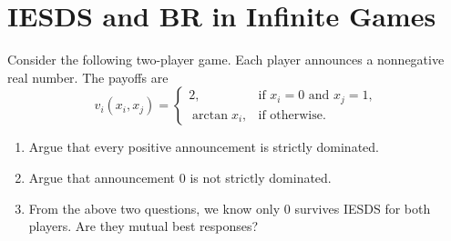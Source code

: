 \documentclass[12pt,a4paper]{article}
\begin{document}
\section{IESDS and BR in Infinite Games}
Consider the following two-player game. Each player announces a nonnegative real number. The payoffs are
\[
  v_i(x_i, x_j)=
  \begin{cases}
    2, & \text{if } x_i=0 \text{ and } x_j=1,\\[6pt]
    \arctan x_i, & \text{if otherwise.}
  \end{cases}
\]
\begin{enumerate}[label=(\alph*)]
  \item Argue that every positive announcement is strictly dominated.
  \item Argue that announcement 0 is not strictly dominated.
  \item From the above two questions, we know only 0 survives IESDS for both players. Are they mutual best responses?
\end{enumerate}

\vspace{0.5cm}
\end{document}
